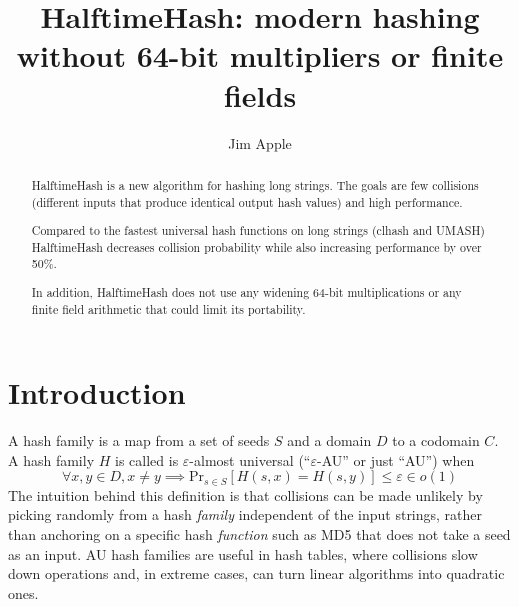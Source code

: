 \documentclass[runningheads]{llncs}
\begin{document}
\title{HalftimeHash: modern hashing without 64-bit multipliers or finite fields}
\author{Jim Apple
}


\maketitle


\begin{abstract}
HalftimeHash is a new algorithm for hashing long strings.
The goals are few collisions (different inputs that produce identical output hash values) and high performance.

Compared to the fastest universal hash functions on long strings (clhash and UMASH) HalftimeHash decreases collision probability while also increasing performance by over 50\%.

In addition, HalftimeHash does not use any widening 64-bit multiplications or any finite field arithmetic that could limit its portability.

\end{abstract}

\section{Introduction}
A hash family is a map from a set of seeds $S$ and a domain $D$ to a codomain $C$.
A hash family $H$ is called is $\varepsilon$-almost universal (``$\varepsilon$-AU'' or just ``AU'') when
\[
\forall x,y \in D, x \neq y \implies \mathrm{Pr}_{s \in S}[H(s, x) = H(s, y)] \leq \varepsilon \in o(1)
\]
The intuition behind this definition is that collisions can be made unlikely by picking randomly from a hash {\em family} independent of the input strings, rather than anchoring on a specific hash {\em function} such as MD5 that does not take a seed as an input. AU hash families are useful in hash tables, where collisions slow down operations and, in extreme cases, can turn linear algorithms into quadratic ones. \cite{tabulation,rust-quadratic,impala-quadratic,algorithm-attack}
\end{document}
